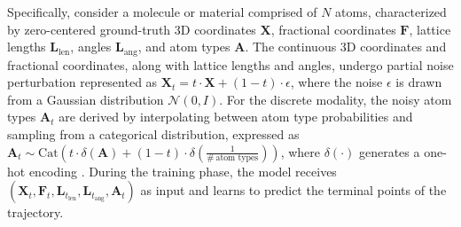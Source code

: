 \documentclass{article}
\theoremstyle{plain}
\theoremstyle{definition}
\theoremstyle{remark}
\begin{document}
Specifically, consider a molecule or material comprised of $N$ atoms, characterized by zero-centered ground-truth 3D coordinates $\bm{X}$, fractional coordinates $\bm{F}$, lattice lengths $\bm{L}_\text{len}$, angles $\bm{L}_\text{ang}$, and atom types $\bm{A}$. The continuous 3D coordinates and fractional coordinates, along with lattice lengths and angles, undergo partial noise perturbation represented as $\bm{X}_t = t \cdot \bm{X} + (1-t) \cdot \epsilon$, where the noise $\epsilon$ is drawn from a Gaussian distribution $\mathcal{N}(0, I)$. For the discrete modality, the noisy atom types $\bm{A}_t$ are derived by interpolating between atom type probabilities and sampling from a categorical distribution, expressed as $\bm{A}_t \sim \text{Cat}(t \cdot \delta(\bm{A}) + (1-t) \cdot \delta(\frac{1}{\#\ \text{atom types}}))$, where $\delta(\cdot)$ generates a one-hot encoding \citep{campbell24dfm}. During the training phase, the model receives $\left(\bm{X}_t, \bm{F}_t, \bm{L}_{t_\text{len}}, \bm{L}_{t_\text{ang}}, \bm{A}_t\right)$ as input and learns to predict the terminal points of the trajectory.
\end{document}
